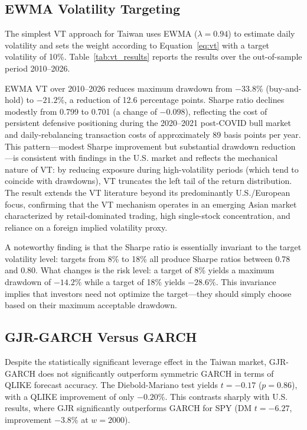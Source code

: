 \subsection{EWMA Volatility Targeting}

The simplest VT approach for Taiwan uses EWMA ($\lambda = 0.94$) to estimate daily volatility and sets the weight according to Equation~\eqref{eq:vt} with a target volatility of 10\%. Table~\ref{tab:vt_results} reports the results over the out-of-sample period 2010--2026.

EWMA VT over 2010--2026 reduces maximum drawdown from $-33.8\%$ (buy-and-hold) to $-21.2\%$, a reduction of 12.6 percentage points. Sharpe ratio declines modestly from 0.799 to 0.701 (a change of $-0.098$), reflecting the cost of persistent defensive positioning during the 2020--2021 post-COVID bull market and daily-rebalancing transaction costs of approximately 89 basis points per year. This pattern---modest Sharpe improvement but substantial drawdown reduction---is consistent with findings in the U.S. market \citep{moreira2017,harvey2018} and reflects the mechanical nature of VT: by reducing exposure during high-volatility periods (which tend to coincide with drawdowns), VT truncates the left tail of the return distribution. The result extends the VT literature beyond its predominantly U.S./European focus, confirming that the VT mechanism operates in an emerging Asian market characterized by retail-dominated trading, high single-stock concentration, and reliance on a foreign implied volatility proxy.

A noteworthy finding is that the Sharpe ratio is essentially invariant to the target volatility level: targets from 8\% to 18\% all produce Sharpe ratios between 0.78 and 0.80. What changes is the risk level: a target of 8\% yields a maximum drawdown of $-14.2\%$ while a target of 18\% yields $-28.6\%$. This invariance implies that investors need not optimize the target---they should simply choose based on their maximum acceptable drawdown.

\subsection{GJR-GARCH Versus GARCH}

Despite the statistically significant leverage effect in the Taiwan market, GJR-GARCH does not significantly outperform symmetric GARCH in terms of QLIKE forecast accuracy. The Diebold-Mariano test yields $t = -0.17$ ($p = 0.86$), with a QLIKE improvement of only $-0.20\%$. This contrasts sharply with U.S. results, where GJR significantly outperforms GARCH for SPY (DM $t = -6.27$, improvement $-3.8\%$ at $w = 2000$).

